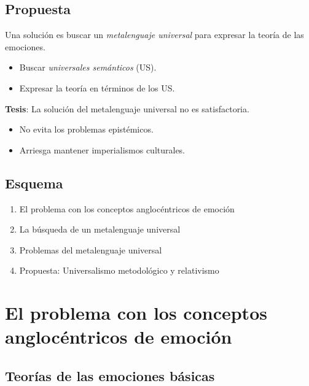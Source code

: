 \documentclass{article}
\newcommand{\annotation}[1]{\marginnote{\small\color{gray}#1}}
\providecommand{\tightlist}{%
  \setlength{\itemsep}{0pt}\setlength{\parskip}{0pt}}
\begin{document}
\subsection{Propuesta}\label{propuesta}

Una solución es buscar un \emph{metalenguaje universal} para expresar la
teoría de las emociones.\annotation{Wierzbicka, 1992}

\begin{itemize}
\tightlist
\item
  Buscar \emph{universales semánticos} (US).
\item
  Expresar la teoría en términos de los US.
\end{itemize}

\textbf{Tesis}: La solución del metalenguaje universal no es
satisfactoria.

\begin{itemize}
\tightlist
\item
  No evita los problemas epistémicos.
\item
  Arriesga mantener imperialismos culturales.
\end{itemize}

\subsection{Esquema}\label{esquema}

\begin{enumerate}
\def\labelenumi{\arabic{enumi}.}
\tightlist
\item
  El problema con los conceptos anglocéntricos de emoción
\item
  La búsqueda de un metalenguaje universal
\item
  Problemas del metalenguaje universal
\item
  Propuesta: Universalismo metodológico y relativismo
\end{enumerate}

\section{El problema con los conceptos anglocéntricos de
emoción}\label{el-problema-con-los-conceptos-anglocuxe9ntricos-de-emociuxf3n}

\subsection{Teorías de las emociones
básicas}\label{teoruxedas-de-las-emociones-buxe1sicas}
\end{document}
